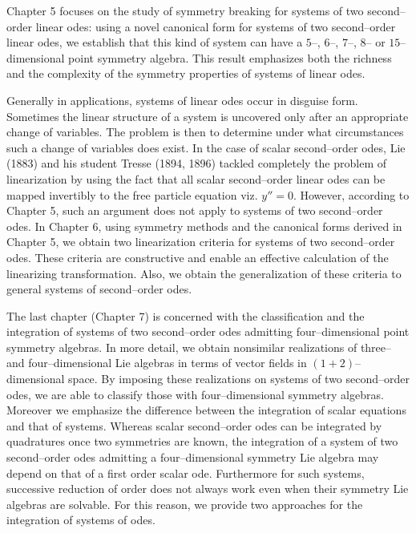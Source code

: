 Chapter 5 focuses on the study of symmetry breaking for systems of two
second--order linear odes: using a novel canonical form for systems of two
second--order linear odes, we establish that  this kind of system can have
a $5$--, $6$--, $7$--, $8$-- or $15$--dimensional point symmetry algebra.
This
result emphasizes both the richness and the complexity of  the symmetry
properties of systems of linear odes.

Generally in applications, systems of linear odes occur in disguise form.
Sometimes the linear structure of a system is uncovered only after an
appropriate change of variables. The problem is then to determine under
what circumstances such a change of variables does exist.
In the case of scalar second--order odes,
Lie (1883) and his student Tresse (1894, 1896) tackled completely
the problem of
linearization by using the fact that all scalar second--order linear odes
can be
mapped invertibly to the free particle equation viz. $y''=0$.
However, according to 
Chapter 5, such an argument does not apply to systems of two second--order
odes. In Chapter 6, using symmetry methods and the canonical forms derived in
Chapter 5, we obtain two linearization criteria for systems of two
second--order odes. These criteria are constructive and enable an effective
calculation of the linearizing transformation. Also, we obtain the
generalization of these criteria to general systems of second--order odes.

The last chapter (Chapter 7) is concerned with the classification and the integration of
systems of two second--order odes admitting four--dimensional point symmetry
algebras. In more detail, we obtain nonsimilar realizations of three-- and
four--dimensional Lie algebras in terms of vector fields in
$(1+2)$--dimensional space.
By imposing these realizations on systems of two second--order odes, we are
able to classify those with four--dimensional symmetry algebras. Moreover we
emphasize the difference between the integration of scalar equations and that
of systems. Whereas scalar second--order odes can be integrated by
quadratures once two symmetries are known, the integration of a system of two
second--order odes admitting a four--dimensional symmetry Lie algebra may
depend on that of a first order scalar ode. Furthermore for such systems,
successive reduction of order does not always work even when their symmetry
Lie algebras are solvable. For this reason, we provide two approaches for the
integration of systems of odes.

%
